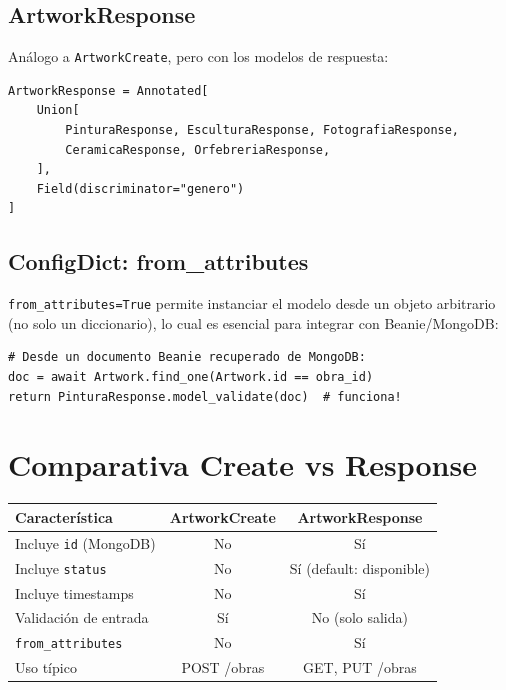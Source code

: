 \documentclass[12pt,a4paper]{article}
\begin{document}
\subsection{ArtworkResponse}

Análogo a \texttt{ArtworkCreate}, pero con los modelos de respuesta:

\begin{lstlisting}
ArtworkResponse = Annotated[
    Union[
        PinturaResponse, EsculturaResponse, FotografiaResponse,
        CeramicaResponse, OrfebreriaResponse,
    ],
    Field(discriminator="genero")
]
\end{lstlisting}

\subsection{ConfigDict: from\_attributes}

\texttt{from\_attributes=True} permite instanciar el modelo desde un objeto
arbitrario (no solo un diccionario), lo cual es esencial para integrar con
Beanie/MongoDB:

\begin{lstlisting}
# Desde un documento Beanie recuperado de MongoDB:
doc = await Artwork.find_one(Artwork.id == obra_id)
return PinturaResponse.model_validate(doc)  # funciona!
\end{lstlisting}

\section{Comparativa Create vs Response}

\begin{center}
\begin{tabular}{l|c|c}
\toprule
\textbf{Característica} & \textbf{ArtworkCreate} & \textbf{ArtworkResponse} \\
\midrule
Incluye \texttt{id} (MongoDB) & No & Sí \\
Incluye \texttt{status} & No & Sí (default: disponible) \\
Incluye timestamps & No & Sí \\
Validación de entrada & Sí & No (solo salida) \\
\texttt{from\_attributes} & No & Sí \\
Uso típico & POST /obras & GET, PUT /obras \\
\bottomrule
\end{tabular}
\end{center}
\end{document}

